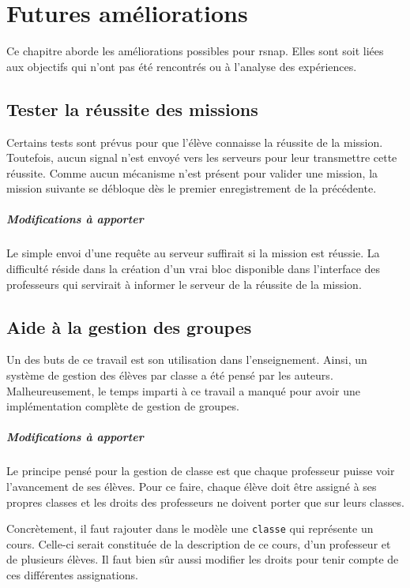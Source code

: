 \chapter{Futures améliorations}
\label{futur}
Ce chapitre aborde les améliorations possibles pour \gls{rsnap}. Elles sont soit liées aux objectifs qui n'ont pas été rencontrés ou à l'analyse des expériences.

\section{Tester la réussite des missions}
Certains tests sont prévus pour que l'élève connaisse la réussite de la \gls{mission}. Toutefois, aucun signal n'est envoyé vers les serveurs pour leur transmettre cette réussite. Comme aucun mécanisme n'est présent pour valider une \gls{mission}, la \gls{mission} suivante se débloque dès le premier enregistrement de la précédente.

\paragraph{Modifications à apporter}
Le simple envoi d'une requête au serveur suffirait si la \gls{mission} est réussie. La difficulté réside dans la création d'un vrai \gls{bloc} disponible dans l'interface des professeurs qui servirait à informer le serveur de la réussite de la \gls{mission}.

\section{Aide à la gestion des groupes}
Un des buts de ce travail est son utilisation dans l'enseignement. Ainsi, un système de gestion des élèves par classe a été pensé par les auteurs. Malheureusement, le temps imparti à ce travail a manqué pour avoir une implémentation complète de gestion de groupes.

\paragraph{Modifications à apporter}
Le principe pensé pour la gestion de classe est que chaque professeur puisse voir l'avancement de ses élèves. Pour ce faire, chaque élève doit être assigné à ses propres classes et les droits des professeurs ne doivent porter que sur leurs classes.

Concrètement, il faut rajouter dans le modèle une \texttt{classe} qui représente un cours. Celle-ci serait constituée de la description de ce cours, d'un professeur et de plusieurs élèves. Il faut bien sûr aussi modifier les droits pour tenir compte de ces différentes assignations.

